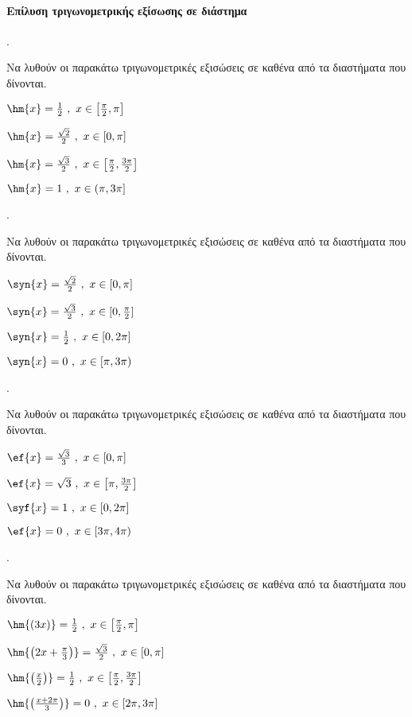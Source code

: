 \documentclass[11pt,a4paper,twocolumn]{article}
\newcounter{askhsh}
\newcommand{\askhsh}{\large\theaskhsh.\ \addtocounter{askhsh}{1}}
\begin{document}
\paragraph{Επίλυση τριγωνομετρικής εξίσωσης σε διάστημα}
\askhsh 
Να λυθούν οι παρακάτω τριγωνομετρικές εξισώσεις σε καθένα από τα διαστήματα που δίνονται.
\begin{alist}
\item $ \hm{x}=\frac{1}{2}\ ,\ x\in\left[\frac{\pi}{2},\pi\right]  $
\item $ \hm{x}=\frac{\sqrt{2}}{2}\ ,\ x\in[0,\pi] $
\item $ \hm{x}=\frac{\sqrt{3}}{2}\ ,\ x\in\left[\frac{\pi}{2},\frac{3\pi}{2}\right]  $
\item $ \hm{x}=1\ ,\ x\in(\pi,3\pi] $
\end{alist}
\askhsh Να λυθούν οι παρακάτω τριγωνομετρικές εξισώσεις σε καθένα από τα διαστήματα που δίνονται.
\begin{alist}
\item $ \syn{x}=\frac{\sqrt{2}}{2}\ ,\ x\in\left[0,\pi\right]  $
\item $ \syn{x}=\frac{\sqrt{3}}{2}\ ,\ x\in[0,\frac{\pi}{2}] $
\item $ \syn{x}=\frac{1}{2}\ ,\ x\in\left[0,2\pi\right]  $
\item $ \syn{x}=0\ ,\ x\in[\pi,3\pi) $
\end{alist}
\askhsh Να λυθούν οι παρακάτω τριγωνομετρικές εξισώσεις σε καθένα από τα διαστήματα που δίνονται.
\begin{alist}
\item $ \ef{x}=\frac{\sqrt{3}}{3}\ ,\ x\in\left[0,\pi\right]  $
\item $ \ef{x}=\sqrt{3}\ ,\ x\in\left[ \pi,\frac{3\pi}{2}\right]  $
\item $ \syf{x}=1\ ,\ x\in\left[0,2\pi\right]  $
\item $ \ef{x}=0\ ,\ x\in[3\pi,4\pi) $
\end{alist}
\askhsh Να λυθούν οι παρακάτω τριγωνομετρικές εξισώσεις σε καθένα από τα διαστήματα που δίνονται.
\begin{alist}
\item $ \hm{(3x)}=\frac{1}{2}\ ,\ x\in\left[\frac{\pi}{2},\pi\right]  $
\item $ \hm{\left(2x+\frac{\pi}{3}\right) }=\frac{\sqrt{3}}{2}\ ,\ x\in[0,\pi] $
\item $ \hm{\left(\frac{x}{2}\right) }=\frac{1}{2}\ ,\ x\in\left[\frac{\pi}{2},\frac{3\pi}{2}\right]  $
\item $ \hm{\left(\frac{x+2\pi}{3}\right) }=0\ ,\ x\in[2\pi,3\pi] $
\end{alist}
\end{document}
